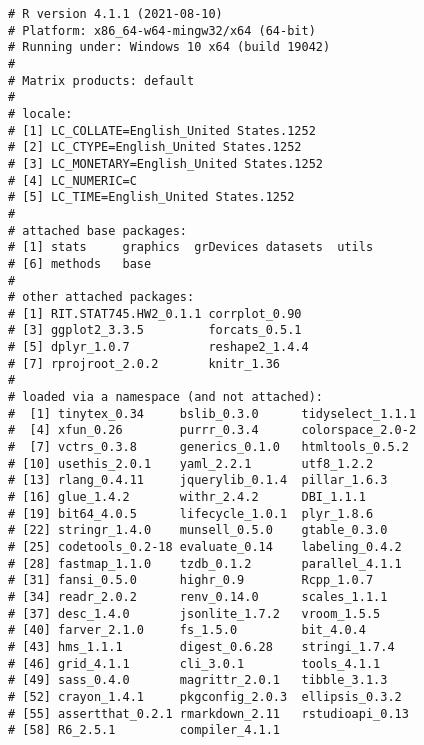 \documentclass[
  11pt,
  a4paper,
]{scrartcl}
\begin{document}
\begin{verbatim}
# R version 4.1.1 (2021-08-10)
# Platform: x86_64-w64-mingw32/x64 (64-bit)
# Running under: Windows 10 x64 (build 19042)
# 
# Matrix products: default
# 
# locale:
# [1] LC_COLLATE=English_United States.1252 
# [2] LC_CTYPE=English_United States.1252   
# [3] LC_MONETARY=English_United States.1252
# [4] LC_NUMERIC=C                          
# [5] LC_TIME=English_United States.1252    
# 
# attached base packages:
# [1] stats     graphics  grDevices datasets  utils    
# [6] methods   base     
# 
# other attached packages:
# [1] RIT.STAT745.HW2_0.1.1 corrplot_0.90        
# [3] ggplot2_3.3.5         forcats_0.5.1        
# [5] dplyr_1.0.7           reshape2_1.4.4       
# [7] rprojroot_2.0.2       knitr_1.36           
# 
# loaded via a namespace (and not attached):
#  [1] tinytex_0.34     bslib_0.3.0      tidyselect_1.1.1
#  [4] xfun_0.26        purrr_0.3.4      colorspace_2.0-2
#  [7] vctrs_0.3.8      generics_0.1.0   htmltools_0.5.2 
# [10] usethis_2.0.1    yaml_2.2.1       utf8_1.2.2      
# [13] rlang_0.4.11     jquerylib_0.1.4  pillar_1.6.3    
# [16] glue_1.4.2       withr_2.4.2      DBI_1.1.1       
# [19] bit64_4.0.5      lifecycle_1.0.1  plyr_1.8.6      
# [22] stringr_1.4.0    munsell_0.5.0    gtable_0.3.0    
# [25] codetools_0.2-18 evaluate_0.14    labeling_0.4.2  
# [28] fastmap_1.1.0    tzdb_0.1.2       parallel_4.1.1  
# [31] fansi_0.5.0      highr_0.9        Rcpp_1.0.7      
# [34] readr_2.0.2      renv_0.14.0      scales_1.1.1    
# [37] desc_1.4.0       jsonlite_1.7.2   vroom_1.5.5     
# [40] farver_2.1.0     fs_1.5.0         bit_4.0.4       
# [43] hms_1.1.1        digest_0.6.28    stringi_1.7.4   
# [46] grid_4.1.1       cli_3.0.1        tools_4.1.1     
# [49] sass_0.4.0       magrittr_2.0.1   tibble_3.1.3    
# [52] crayon_1.4.1     pkgconfig_2.0.3  ellipsis_0.3.2  
# [55] assertthat_0.2.1 rmarkdown_2.11   rstudioapi_0.13 
# [58] R6_2.5.1         compiler_4.1.1
\end{verbatim}
\end{document}
